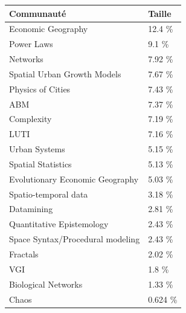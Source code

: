 \begin{table}
\begin{tabular}{|l|l|}
\hline
Communauté & Taille \\ \hline
Economic Geography & 12.4 \% \\
Power Laws & 9.1 \% \\
Networks & 7.92 \% \\
Spatial Urban Growth Models & 7.67 \% \\
Physics of Cities & 7.43 \% \\
ABM & 7.37 \% \\
Complexity & 7.19 \% \\
LUTI & 7.16 \% \\
Urban Systems & 5.15 \% \\
Spatial Statistics & 5.13 \% \\
Evolutionary Economic Geography & 5.03 \% \\
Spatio-temporal data & 3.18 \% \\
Datamining & 2.81 \% \\
Quantitative Epistemology & 2.43 \% \\
Space Syntax/Procedural modeling & 2.43 \% \\
Fractals & 2.02 \% \\
VGI & 1.8 \% \\
Biological Networks & 1.33 \% \\
Chaos & 0.624 \% \\\hline
\end{tabular}
\end{table}


